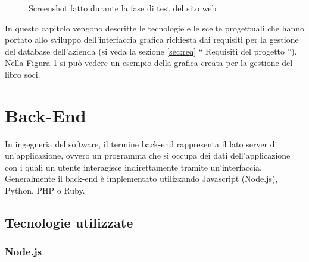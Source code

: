 \documentclass[12pt]{report}
\begin{document}
\begin{figure}[H]
	\caption{Screenshot fatto durante la fase di test del sito web}
	\label{fig:esempio_libro_soci}
\end{figure}

In questo capitolo vengono descritte le tecnologie e le scelte progettuali che hanno portato allo sviluppo dell'interfaccia grafica richiesta dai requisiti per la gestione del database dell'azienda (si veda la sezione \ref{sec:req} \textquotedblleft{} Requisiti del progetto \textquotedblright{}). Nella Figura \ref{fig:esempio_libro_soci} si può vedere un esempio della grafica creata per la gestione del libro soci.

%
\section{Back-End}

In ingegneria del software, il termine back-end rappresenta il lato server di un'applicazione, ovvero un programma che si occupa dei dati dell'applicazione con i quali un utente interagisce indirettamente tramite un'interfaccia. Generalmente il back-end è implementato utilizzando Javascript (Node.js), Python, PHP o Ruby.

\subsection{Tecnologie utilizzate}

\subsubsection*{Node.js}
\end{document}
